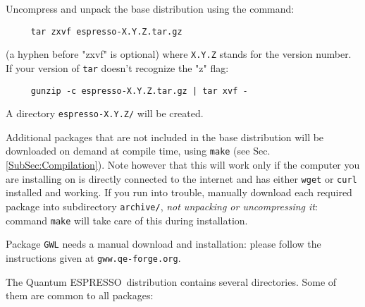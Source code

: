 \documentclass[12pt,a4paper]{article}
\def\qe{{\sc Quantum ESPRESSO}}
\begin{document}
Uncompress and unpack the base distribution using the command:
\begin{verbatim}
     tar zxvf espresso-X.Y.Z.tar.gz
\end{verbatim}
(a hyphen before "zxvf" is optional) where \texttt{X.Y.Z} stands for the
version number. If your version of \texttt{tar}
doesn't recognize the "z" flag:
\begin{verbatim}
     gunzip -c espresso-X.Y.Z.tar.gz | tar xvf -
\end{verbatim}
A directory \texttt{espresso-X.Y.Z/} will be created.

Additional packages that are not included in the base distribution
will be downloaded on demand at compile time, using \texttt{make}
(see Sec.\ref{SubSec:Compilation}).
Note however that this will work only if the computer you are
installing on is directly connected to the internet and has
either \texttt{wget} or \texttt{curl} installed and working.
If you run into trouble, manually download each required package
into subdirectory \texttt{archive/}, {\em not unpacking or
uncompressing it}:
command \texttt{make} will take care of this during installation.

Package \texttt{GWL} needs a manual download and installation:
please follow the instructions given at \texttt{gww.qe-forge.org}.




The \qe\ distribution contains several directories. Some of them are
common to all packages:
\end{document}
